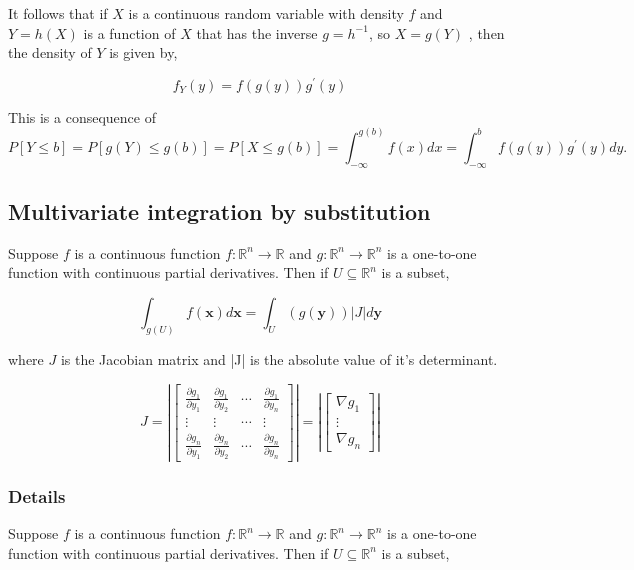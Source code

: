 \documentclass[12pt,a4paper]{article}
\theoremstyle{regla}
\theoremstyle{remark}
\theoremstyle{definition}
\theoremstyle{nonumberbreak}
\begin{document}
It follows that if $X$ is a continuous random variable with density $f$ and $ Y = h(X)$ is a function of $X$ that has the inverse $g=h^{-1}$, so  $ X = g(Y)$ , then the density of $Y$ is given by,

$$f_Y(y)   = f (g(y)) g^\prime (y)$$

This is a consequence of
$$ P [Y \leq b] = P [g(Y) \leq g(b)] = P [X \leq g(b)] = \int_{- \infty} ^{g(b)}f(x)dx = \int_{- \infty} ^b f (g(y))g^\prime (y)dy.$$

\subsection{Multivariate integration by substitution}
\begin{fbox}
\begin{minipage}{0.97\textwidth}
Suppose $f$ is a continuous function 
$f: \mathbb{R}^n \rightarrow \mathbb{R}$ and $g: \mathbb{R}^n \rightarrow \mathbb{R}^n$ is a one-to-one function with continuous partial derivatives. Then if $ U \subseteq \mathbb{R}^n$ is a subset,

$$\int_{g(U)} f(\mathbf {x})d\mathbf {x}  = \int_{U}({g}(\mathbf {y}))|J|d\mathbf {y}$$

where $J$ is the Jacobian matrix and |J| is the absolute value of it's determinant.


$$J=
\left|\begin{bmatrix}
\frac{\partial g_1}{\partial y_1} & \frac{\partial g_1}{\partial y_2} & \cdots &\frac{\partial g_1}{\partial y_n} \\
\vdots & \vdots & \cdots & \vdots \\
\frac{\partial g_n}{\partial y_1} & \frac{\partial g_n}{\partial y_2} & \cdots & \frac{\partial g_n}{\partial y_n} 
\end{bmatrix}\right| = 
\left|\begin{bmatrix}
\nabla g_1 \\
 \vdots \\
\nabla g_n 
\end{bmatrix}\right|$$


\end{minipage}
\end{fbox}
\subsubsection{Details}
Suppose $f$ is a continuous function 
$f: \mathbb{R}^n \rightarrow \mathbb{R}$ and $g: \mathbb{R}^n \rightarrow \mathbb{R}^n$ is a one-to-one function with continuous partial derivatives. Then if $ U \subseteq \mathbb{R}^n$ is a subset,
\end{document}
